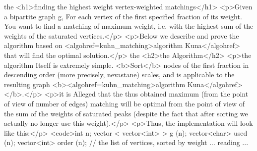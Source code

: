 the <h1>finding the highest weight vertex-weighted matchings</h1>
<p>Given a bipartite graph g, For each vertex of the first specified fraction of its weight. You want to find a matching of maximum weight, i.e. with the highest sum of the weights of the saturated vertices.</p>
<p>Below we describe and prove the algorithm based on <algohref=kuhn_matching>algorithm Kuna</algohref> that will find the optimal solution.</p>
the <h2>the Algorithm</h2>
<p>the algorithm Itself is extremely simple. <b>Sort</b> nodes of the first fraction in descending order (more precisely, nevastane) scales, and is applicable to the resulting graph <b><algohref=kuhn_matching>algorithm Kuna</algohref></b>.</p>
<p>it is Alleged that the thus obtained maximum (from the point of view of number of edges) matching will be optimal from the point of view of the sum of the weights of saturated peaks (despite the fact that after sorting we actually no longer use this weight).</p>
<p>Thus, the implementation will look like this:</p>
<code>int n;
vector < vector<int> > g (n);
vector<char> used (n);
vector<int> order (n); // the list of vertices, sorted by weight
... reading ...

